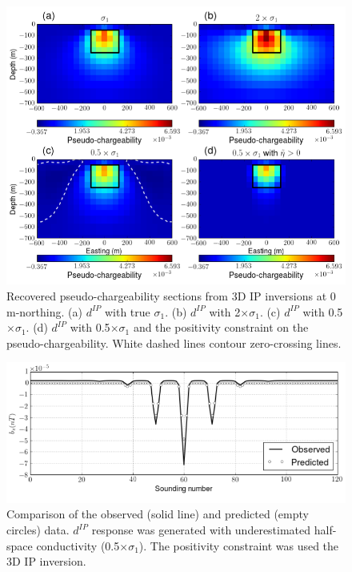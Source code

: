 \documentclass[a4paper, 11pt]{article}
\newcommand{\dip}{d^{IP}}
\begin{document}
\begin{figure}[htb]
  \centering
  \includegraphics[width=1.\textwidth]{figures/Regional_IPInv.png}
  \caption{Recovered pseudo-chargeability sections from 3D IP inversions at 0 m-northing. (a) $\dip$ with true $\sigma_1$. (b) $\dip$ with 2$\times \sigma_1$. (c) $\dip$ with 0.5$\times \sigma_1$. (d) $\dip$ with 0.5$\times \sigma_1$ and the positivity constraint on the pseudo-chargeability. White dashed lines contour zero-crossing lines.}
  \label{F:Regional_IPInv}
\end{figure}

\begin{figure}[htb]
  \centering
  \includegraphics[width=1.\textwidth]{figures/Reg_obspred.png}
  \caption{Comparison of the observed (solid line) and predicted (empty circles) data. $\dip$ response was generated with underestimated half-space conductivity (0.5$\times \sigma_1$). The positivity constraint was used the 3D IP inversion.}
  \label{F:Reg_obspred}
\end{figure}
\end{document}
